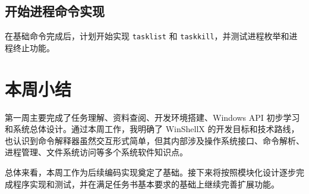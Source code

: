 \documentclass[UTF8]{ctexart}
\begin{document}
\subsection{开始进程命令实现}

在基础命令完成后，计划开始实现 \texttt{tasklist} 和 \texttt{taskkill}，并测试进程枚举和进程终止功能。

\section{本周小结}

第一周主要完成了任务理解、资料查阅、开发环境搭建、Windows API 初步学习和系统总体设计。通过本周工作，我明确了 WinShellX 的开发目标和技术路线，也认识到命令解释器虽然交互形式简单，但其内部涉及操作系统接口、命令解析、进程管理、文件系统访问等多个系统软件知识点。

总体来看，本周工作为后续编码实现奠定了基础。接下来将按照模块化设计逐步完成程序实现和测试，并在满足任务书基本要求的基础上继续完善扩展功能。
\end{document}
